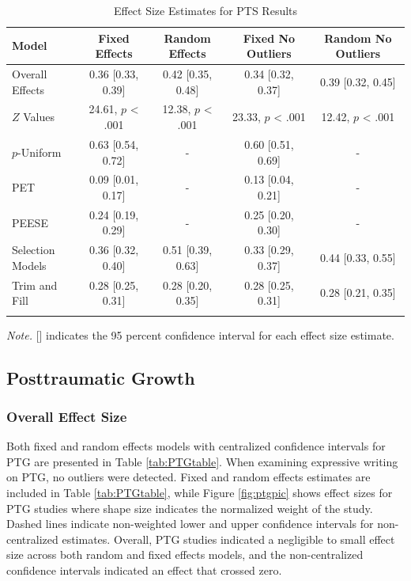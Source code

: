 \documentclass[,man]{apa6}
\begin{document}
\begin{table}[tbp]
\begin{center}
\begin{threeparttable}
\caption{\label{tab:PTStable}Effect Size Estimates for PTS Results}
\small{
\begin{tabular}{lcccc}
\toprule
Model & Fixed Effects & Random Effects & Fixed No Outliers & Random No Outliers\\
\midrule
Overall Effects & 0.36 [0.33, 0.39] & 0.42 [0.35, 0.48] & 0.34 [0.32, 0.37] & 0.39 [0.32, 0.45]\\
$Z$ Values & 24.61, $p$ < .001 & 12.38, $p$ < .001 & 23.33, $p$ < .001 & 12.42, $p$ < .001\\
$p$-Uniform & 0.63 [0.54, 0.72] & - & 0.60 [0.51, 0.69] & -\\
PET & 0.09 [0.01, 0.17] & - & 0.13 [0.04, 0.21] & -\\
PEESE & 0.24 [0.19, 0.29] & - & 0.25 [0.20, 0.30] & -\\
Selection Models & 0.36 [0.32, 0.40] & 0.51 [0.39, 0.63] & 0.33 [0.29, 0.37] & 0.44 [0.33, 0.55]\\
Trim and Fill & 0.28 [0.25, 0.31] & 0.28 [0.20, 0.35] & 0.28 [0.25, 0.31] & 0.28 [0.21, 0.35]\\
\bottomrule
\addlinespace
\end{tabular}
}
\begin{tablenotes}[para]
\normalsize{\textit{Note.} [] indicates the 95 percent confidence interval for each effect size estimate.}
\end{tablenotes}
\end{threeparttable}
\end{center}
\end{table}

\hypertarget{posttraumatic-growth-1}{%
\subsection{Posttraumatic Growth}\label{posttraumatic-growth-1}}

\hypertarget{overall-effect-size-1}{%
\subsubsection{Overall Effect Size}\label{overall-effect-size-1}}

Both fixed and random effects models with centralized confidence intervals for PTG are presented in Table \ref{tab:PTGtable}. When examining expressive writing on PTG, no outliers were detected. Fixed and random effects estimates are included in Table \ref{tab:PTGtable}, while Figure \ref{fig:ptgpic} shows effect sizes for PTG studies where shape size indicates the normalized weight of the study. Dashed lines indicate non-weighted lower and upper confidence intervals for non-centralized estimates. Overall, PTG studies indicated a negligible to small effect size across both random and fixed effects models, and the non-centralized confidence intervals indicated an effect that crossed zero.
\end{document}
